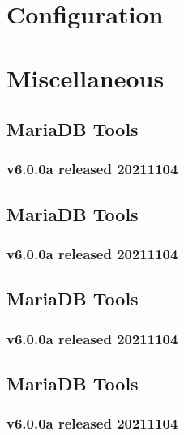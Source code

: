 \documentclass[letterpaper,10pt,english]{sphinxmanual}
\begin{document}
\part{Configuration}
\label{\detokenize{index:configuration}}

\part{Miscellaneous}
\label{\detokenize{index:miscellaneous}}

\chapter{MariaDB Tools}
\label{\detokenize{release_notes:mariadb-tools}}\label{\detokenize{release_notes::doc}}

\section{v6.0.0a released 2021\sphinxhyphen{}11\sphinxhyphen{}04}
\label{\detokenize{release_notes:v6-0-0a-released-2021-11-04}}

\chapter{MariaDB Tools}
\label{\detokenize{release_notes:id1}}

\section{v6.0.0a released 2021\sphinxhyphen{}11\sphinxhyphen{}04}
\label{\detokenize{release_notes:id2}}

\chapter{MariaDB Tools}
\label{\detokenize{release_notes:id3}}

\section{v6.0.0a released 2021\sphinxhyphen{}11\sphinxhyphen{}04}
\label{\detokenize{release_notes:id4}}

\chapter{MariaDB Tools}
\label{\detokenize{release_notes:id5}}

\section{v6.0.0a released 2021\sphinxhyphen{}11\sphinxhyphen{}04}
\label{\detokenize{release_notes:id6}}
\end{document}
